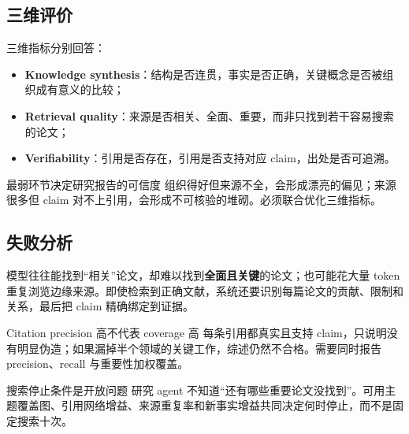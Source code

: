 \documentclass[a4paper]{article}
\begin{document}
\subsection{三维评价}


三维指标分别回答：

\begin{itemize}
    \item \textbf{Knowledge synthesis}：结构是否连贯，事实是否正确，关键概念是否被组织成有意义的比较；
    \item \textbf{Retrieval quality}：来源是否相关、全面、重要，而非只找到若干容易搜索的论文；
    \item \textbf{Verifiability}：引用是否存在，引用是否支持对应 claim，出处是否可追溯。
\end{itemize}


\begin{importantbox}{最弱环节决定研究报告的可信度}
组织得好但来源不全，会形成漂亮的偏见；来源很多但 claim 对不上引用，会形成不可核验的堆砌。必须联合优化三维指标。
\end{importantbox}

\subsection{失败分析}


模型往往能找到“相关”论文，却难以找到\textbf{全面且关键}的论文；也可能花大量 token 重复浏览边缘来源。即使检索到正确文献，系统还要识别每篇论文的贡献、限制和关系，最后把 claim 精确绑定到证据。

\begin{warningbox}{Citation precision 高不代表 coverage 高}
每条引用都真实且支持 claim，只说明没有明显伪造；如果漏掉半个领域的关键工作，综述仍然不合格。需要同时报告 precision、recall 与重要性加权覆盖。
\end{warningbox}

\begin{knowledgebox}{搜索停止条件是开放问题}
研究 agent 不知道“还有哪些重要论文没找到”。可用主题覆盖图、引用网络增益、来源重复率和新事实增益共同决定何时停止，而不是固定搜索十次。
\end{knowledgebox}
\end{document}
